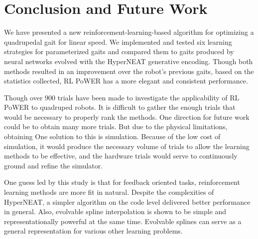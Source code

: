 \section{Conclusion and Future Work}

We have presented a new reinforcement-learning-based algorithm for
optimizing a quadrupedal gait for linear speed. We implemented and
tested six learning strategies for parameterized gaits and compared
them to gaits produced by neural networks evolved with the HyperNEAT
generative encoding. Though both methods resulted in an improvement
over the robot’s previous \naive gaits, based on the statistics
collected, RL PoWER has a more elegant and consistent performance.

Though over 900 trials have been made to investigate the applicability
of RL PoWER to quadruped robots. It is difficult to gather the enough
trials that would be necessary to properly rank the methods. One
direction for future work could be to obtain many more trials. But due
to the physical limitations, obtaining One solution to this is
simulation. Because of the low cost of simulation, it would produce
the necessary volume of trials to allow the learning methods to be
effective, and the hardware trials would serve to continuously ground
and refine the simulator. \cite{glette2012evolution-of-locomotion-in-a-simulated}

One guess led by this study is that for feedback oriented tasks,
reinforcement learning methods are more fit in natural. Despite the
complexities of HyperNEAT, a simpler algorithm on the code level
delivered better performance in general.  Also, evolvable spline
interpolation is shown to be simple and representationally powerful at
the same time. Evolvable splines can serve as a general representation for various other
learning problems.
